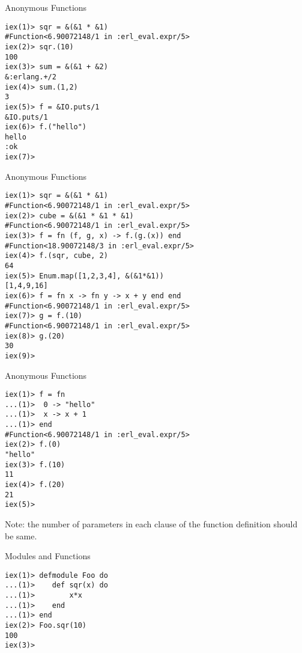 \documentclass{beamer}
\begin{document}
\begin{frame}[fragile]{Anonymous Functions}

\begin{verbatim}
iex(1)> sqr = &(&1 * &1)
#Function<6.90072148/1 in :erl_eval.expr/5>
iex(2)> sqr.(10)
100
iex(3)> sum = &(&1 + &2)
&:erlang.+/2
iex(4)> sum.(1,2)
3
iex(5)> f = &IO.puts/1
&IO.puts/1
iex(6)> f.("hello")
hello
:ok
iex(7)>

\end{verbatim}
\end{frame}

\begin{frame}[fragile]{Anonymous Functions}

\begin{verbatim}
iex(1)> sqr = &(&1 * &1)
#Function<6.90072148/1 in :erl_eval.expr/5>
iex(2)> cube = &(&1 * &1 * &1)
#Function<6.90072148/1 in :erl_eval.expr/5>
iex(3)> f = fn (f, g, x) -> f.(g.(x)) end
#Function<18.90072148/3 in :erl_eval.expr/5>
iex(4)> f.(sqr, cube, 2)
64
iex(5)> Enum.map([1,2,3,4], &(&1*&1))
[1,4,9,16]
iex(6)> f = fn x -> fn y -> x + y end end
#Function<6.90072148/1 in :erl_eval.expr/5>
iex(7)> g = f.(10)
#Function<6.90072148/1 in :erl_eval.expr/5>
iex(8)> g.(20)
30
iex(9)>
\end{verbatim}
\end{frame}
\begin{frame}[fragile]{Anonymous Functions}

\begin{verbatim}
iex(1)> f = fn 
...(1)>  0 -> "hello"
...(1)>  x -> x + 1
...(1)> end
#Function<6.90072148/1 in :erl_eval.expr/5>
iex(2)> f.(0)
"hello"
iex(3)> f.(10)
11
iex(4)> f.(20)
21
iex(5)> 
\end{verbatim}

Note: the number of parameters in each clause of the function 
definition should be same.

\end{frame}
\begin{frame}[fragile]{Modules and Functions}

\begin{verbatim}
iex(1)> defmodule Foo do
...(1)>    def sqr(x) do
...(1)>        x*x
...(1)>    end
...(1)> end
iex(2)> Foo.sqr(10)
100
iex(3)>

\end{verbatim}
\end{frame}
\end{document}
